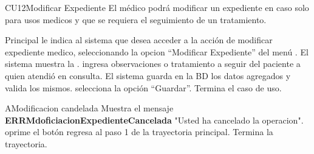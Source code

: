 
% 



	\begin{UseCase}{CU12}{Modificar Expediente}{
		El m\'edico podr\'a modificar un expediente en caso solo para usos medicos y que se requiera el seguimiento de un tratamiento.
	}
	\end{UseCase}

	\begin{UCtrayectoria}{Principal}
		\UCpaso[\UCactor] le indica al sistema que desea acceder a la acci\'on de modificar expediente medico, seleccionando la opcion "`Modificar Expediente"' del men\'u .
		\UCpaso El sistema muestra la \label{IUConsulta} .
		\UCpaso[\UCactor] ingresa observaciones o tratamiento a seguir del paciente a quien atendi\'o en consulta. 
		\UCpaso El sistema guarda en la BD los datos agregados y valida los mismos. 
		\UCpaso [\UCactor] selecciona la opción "`Guardar"'. 
		\UCpaso[] Termina el caso de uso.
	\end{UCtrayectoria}
		
		\begin{UCtrayectoriaA}{A}{Modificacion candelada}
			\UCpaso Muestra el mensaje {\bf ERRMdoficiacionExpedienteCancelada} "Usted ha cancelado la operacion".
			\UCpaso[\UCactor] oprime el botón 
			\UCpaso[\UCactor] regresa al paso 1 de la trayectoria principal.  
			\UCpaso[] Termina la trayectoria.
		\end{UCtrayectoriaA}
		
		
		
